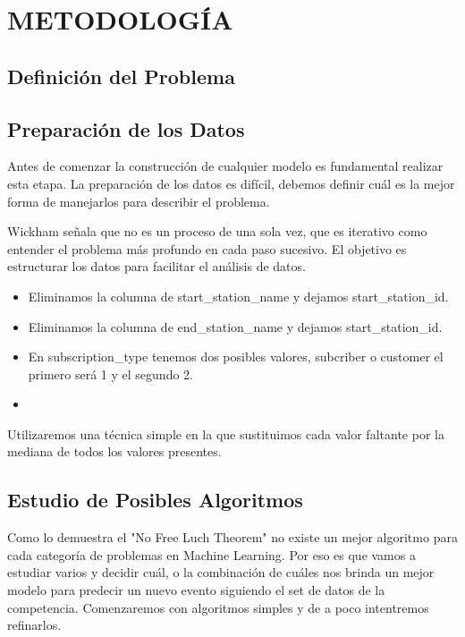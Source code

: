 \section{METODOLOGÍA}

\subsection{Definición del Problema}


\subsection{Preparación de los Datos}
Antes de comenzar la construcción de cualquier modelo es fundamental realizar esta etapa. La preparación de los datos es difícil, debemos definir cuál es la mejor forma de manejarlos para describir el problema.

Wickham señala que no es un proceso de una sola vez, que es iterativo como entender el problema más profundo en cada paso sucesivo. El objetivo es estructurar los datos para facilitar el análisis de datos.\cite{RforDataScience}



\begin{itemize}
   \item Eliminamos la columna de start\_station\_name y dejamos start\_station\_id.
    
    \item Eliminamos la columna de end\_station\_name y dejamos start\_station\_id.
    
    \item En subscription\_type tenemos dos posibles valores, 
    subcriber o customer el primero será 1 y el segundo 2.
    
    \item
    
\end{itemize}

Utilizaremos una técnica simple en la que sustituimos cada valor faltante por la mediana de todos los valores presentes.

\subsection{Estudio de Posibles Algoritmos}

Como lo demuestra el "No Free Luch Theorem" no existe un mejor algoritmo para cada categoría de problemas en Machine Learning.  Por eso es que vamos a estudiar varios y decidir cuál, o la combinación de cuáles nos brinda un mejor modelo para predecir un nuevo evento siguiendo el set de datos de la competencia.
Comenzaremos con algoritmos simples y de a poco intentremos refinarlos.

